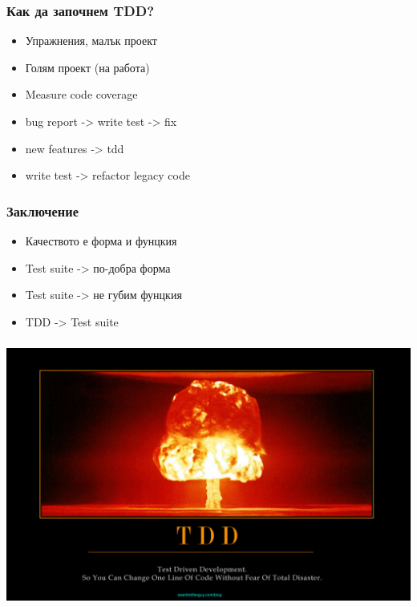 \begin{frame}
  \frametitle{Как да започнем TDD?}
  \pause
  \begin{itemize}
      \item Упражнения, малък проект\pause
      \item Голям проект (на работа)\pause
      \item Measure code coverage\pause
      \item bug report -> write test -> fix\pause
      \item new features -> tdd\pause
      \item write test -> refactor legacy code
  \end{itemize}
\end{frame}

\begin{frame}
  \frametitle{Заключение}
  \begin{itemize}
      \item Качеството е форма и фунцкия\pause
      \item Test suite -> по-добра форма\pause
      \item Test suite -> не губим фунцкия\pause
      \item TDD -> Test suite
  \end{itemize}
\end{frame}

\vspace*{-12.5mm}    
\begin{frame}
\frametitle{}
\hspace*{-11mm}
\includegraphics[width=\paperwidth, width=\paperwidth]{tdd.jpg}
\end{frame}

